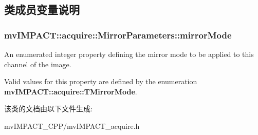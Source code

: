 \subsection{类成员变量说明}
\hypertarget{classmv_i_m_p_a_c_t_1_1acquire_1_1_mirror_parameters_a4765c2473f0ad4f59016365bfb0d746f}{
\subsubsection[{mirror\+Mode}]{ mv\+I\+M\+P\+A\+C\+T\+::acquire\+::\+Mirror\+Parameters\+::mirror\+Mode}}\label{classmv_i_m_p_a_c_t_1_1acquire_1_1_mirror_parameters_a4765c2473f0ad4f59016365bfb0d746f}


An enumerated integer property defining the mirror mode to be applied to this channel of the image. 

Valid values for this property are defined by the enumeration {\bfseries mv\+I\+M\+P\+A\+C\+T\+::acquire\+::\+T\+Mirror\+Mode}. 

该类的文档由以下文件生成\+:\begin{DoxyCompactItemize}
\item 
mv\+I\+M\+P\+A\+C\+T\+\_\+\+C\+P\+P/mv\+I\+M\+P\+A\+C\+T\+\_\+acquire.\+h\end{DoxyCompactItemize}

